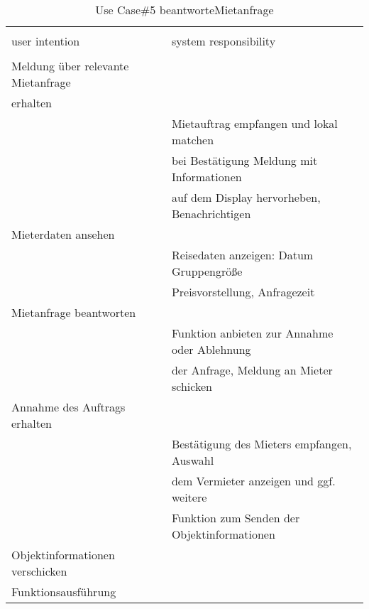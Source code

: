 \begin{table}[H]
\caption{Use Case\#5 beantworteMietanfrage }
\centering
\begin{tabular}{l l}
\\ [-0.5ex]

\hline\hline
\\ [-0.5ex]
user intention & system responsibility
\\ [1.5ex]
\hline
\\ [-0.5ex]
Meldung über relevante Mietanfrage 	& 												\\[1ex]
erhalten 							& 												\\[1ex]
									& Mietauftrag empfangen und lokal matchen		\\[1ex]
									& bei Bestätigung Meldung mit Informationen		\\[1ex]
									& auf dem Display hervorheben, Benachrichtigen	\\[1ex]
Mieterdaten ansehen					& 											 	\\[1ex]
									& Reisedaten anzeigen: Datum Gruppengröße		\\[1ex]
									& Preisvorstellung, Anfragezeit					\\[1ex]
Mietanfrage beantworten  			& 												\\[1ex] 
									& Funktion anbieten zur Annahme oder Ablehnung 	\\[1ex]
									& der Anfrage, Meldung an Mieter schicken      	\\[1ex]
Annahme des Auftrags erhalten		& 											 	\\[1ex]
									& Bestätigung des Mieters empfangen, Auswahl	\\[1ex]
									& dem Vermieter anzeigen und ggf. weitere 		\\[1ex]
									& Funktion zum Senden der Objektinformationen	\\[1ex]
Objektinformationen verschicken		& 											 	\\[1ex]
Funktionsausführung					& 											 	\\[1ex]



\hline
\end{tabular}
\label{tab:mietanfrageUC}
\end{table}

